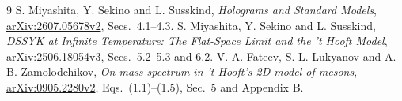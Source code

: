 \documentclass[11pt,a4paper]{article}
\begin{document}
\begin{thebibliography}{9}
 S. Miyashita, Y. Sekino and L. Susskind,
\emph{Holograms and Standard Models},
\href{https://arxiv.org/abs/2607.05678v2}{arXiv:2607.05678v2},
Secs.~4.1--4.3.
 S. Miyashita, Y. Sekino and L. Susskind,
\emph{DSSYK at Infinite Temperature: The Flat-Space Limit and the
't Hooft Model}, \href{https://arxiv.org/abs/2506.18054v3}{arXiv:2506.18054v3},
Secs.~5.2--5.3 and 6.2.
 V. A. Fateev, S. L. Lukyanov and A. B. Zamolodchikov,
\emph{On mass spectrum in 't Hooft's 2D model of mesons},
\href{https://arxiv.org/abs/0905.2280v2}{arXiv:0905.2280v2},
Eqs.~(1.1)--(1.5), Sec.~5 and Appendix B.
\end{thebibliography}
\end{document}
